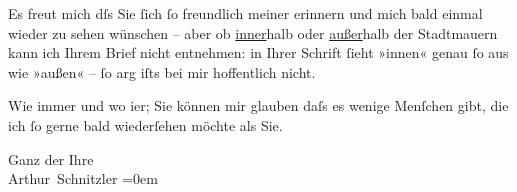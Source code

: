 \pstart
           Es freut mich dſs Sie ſich ſo freundlich meiner erinnern und mich bald einmal wieder
               zu sehen wünschen – aber ob \uline{inner}halb oder \uline{außer}halb der Stadtmauern kann ich Ihrem Brief nicht
               entnehmen: in Ihrer Schrift ſieht {\pb}»innen«
               genau ſo aus wie »außen« – ſo arg iſts bei mir hoffentlich nicht.\pend
           
\pstart
           Wie immer und wo i{\geminationm}er; Sie können mir glauben daſs es
               wenige Menſchen gibt, die ich ſo gerne bald wiederſehen möchte als Sie.\pend
           
\pstart
           Ganz der Ihre{\\[\baselineskip]}\spacefill\mbox{Arthur Schnitzler}\pend
           \leftskip=0em{}\endnumbering{}  
      